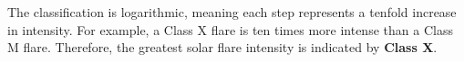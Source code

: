 The classification is logarithmic, meaning each step represents a tenfold increase in intensity. For example, a Class X flare is ten times more intense than a Class M flare. Therefore, the greatest solar flare intensity is indicated by \textbf{Class X}.

